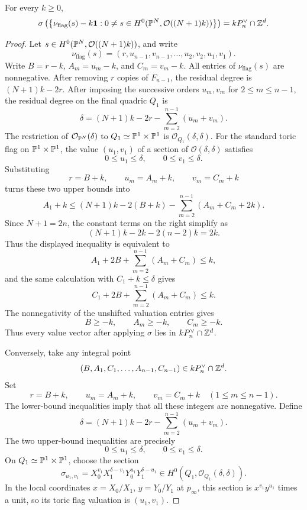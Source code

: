 \begin{prop}\label{prop:no-body-p2n}
For every \(k\ge0\),
\[
\sigma\left(
\left\{
\nu_{\mathrm{flag}}(s)-k\mathbf 1:
0\ne s\in H^0(\mathbb{P}^N,\mathcal O((N+1)k))
\right\}
\right)
=
kP_n^\vee\cap\mathbb{Z}^d.
\]
\end{prop}

\begin{proof}
Let \(s\in H^0(\mathbb{P}^N,\mathcal O((N+1)k))\), and write
\[
\nu_{\mathrm{flag}}(s)=(r,u_{n-1},v_{n-1},\ldots,u_2,v_2,u_1,v_1).
\]
Write \(B=r-k\), \(A_m=u_m-k\), and \(C_m=v_m-k\).
All entries of \(\nu_{\mathrm{flag}}(s)\) are nonnegative. After removing \(r\) copies of \(F_{n-1}\), the residual degree is \((N+1)k-2r\). After imposing the successive orders \(u_m,v_m\) for \(2\le m\le n-1\), the residual degree on the final quadric \(Q_1\) is
\[
\delta=(N+1)k-2r-
\sum_{m=2}^{n-1}(u_m+v_m).
\]
The restriction of \(\mathcal O_{\mathbb{P}^N}(\delta)\) to \(Q_1\simeq\mathbb{P}^1\times\mathbb{P}^1\) is \(\mathcal O_{Q_1}(\delta,\delta)\). For the standard toric flag on \(\mathbb{P}^1\times\mathbb{P}^1\), the value \((u_1,v_1)\) of a section of \(\mathcal O(\delta,\delta)\) satisfies
\[
0\le u_1\le \delta,
\qquad
0\le v_1\le \delta.
\]
Substituting
\[
r=B+k,
\qquad
u_m=A_m+k,
\qquad
v_m=C_m+k
\]
turns these two upper bounds into
\[
A_1+k
\le
(N+1)k-2(B+k)
-
\sum_{m=2}^{n-1}(A_m+C_m+2k).
\]
Since \(N+1=2n\), the constant terms on the right simplify as
\[
(N+1)k-2k-2(n-2)k=2k.
\]
Thus the displayed inequality is equivalent to
\[
A_1+2B+
\sum_{m=2}^{n-1}(A_m+C_m)\le k,
\]
and the same calculation with \(C_1+k\le \delta\) gives
\[
C_1+2B+
\sum_{m=2}^{n-1}(A_m+C_m)\le k.
\]
The nonnegativity of the unshifted valuation entries gives
\[
B\ge -k,
\qquad
A_m\ge -k,
\qquad
C_m\ge -k.
\]
Thus every value vector after applying \(\sigma\) lies in \(kP_n^\vee\cap\mathbb{Z}^d\).

Conversely, take any integral point
\[
(B,A_1,C_1,\ldots,A_{n-1},C_{n-1})\in kP_n^\vee\cap\mathbb{Z}^d.
\]
Set
\[
r=B+k,
\qquad
u_m=A_m+k,
\qquad
v_m=C_m+k
\quad(1\le m\le n-1).
\]
The lower-bound inequalities imply that all these integers are nonnegative. Define
\[
\delta=(N+1)k-2r-
\sum_{m=2}^{n-1}(u_m+v_m).
\]
The two upper-bound inequalities are precisely
\[
0\le u_1\le \delta,
\qquad
0\le v_1\le \delta.
\]
On \(Q_1\simeq\mathbb{P}^1\times\mathbb{P}^1\), choose the section
\[
\sigma_{u_1,v_1}
=
X_0^{v_1}X_1^{\delta-v_1}Y_0^{u_1}Y_1^{\delta-u_1}
\in H^0(Q_1,\mathcal O_{Q_1}(\delta,\delta)).
\]
In the local coordinates \(x=X_0/X_1\), \(y=Y_0/Y_1\) at \(p_\infty\), this section is \(x^{v_1}y^{u_1}\) times a unit, so its toric flag valuation is \((u_1,v_1)\).


\end{proof}
